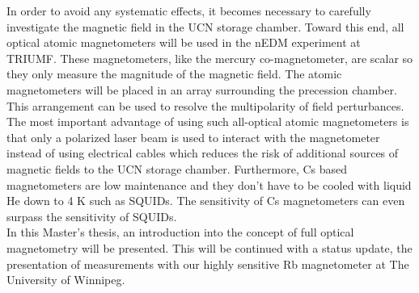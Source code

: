 In order to avoid any systematic effects, it becomes necessary to carefully investigate the magnetic field in the UCN storage chamber.  Toward this end, all optical atomic magnetometers will be used in the nEDM experiment at TRIUMF.  These magnetometers, like the mercury co-magnetometer, are scalar so they only measure the magnitude of the magnetic field.  The atomic  magnetometers will be placed in an array surrounding the precession chamber. This arrangement can be used to resolve the multipolarity of field perturbances. The most important advantage of using such all-optical atomic magnetometers is that only a polarized laser beam is used to interact with the magnetometer instead of using electrical cables which reduces the risk of additional sources of magnetic fields to the UCN storage chamber. Furthermore, Cs based magnetometers are low  maintenance and they don't have to be cooled with liquid He down to 4 K such as SQUIDs.  The sensitivity of Cs magnetometers can even surpass the sensitivity of SQUIDs. \\
In this Master's thesis, an introduction into the concept of full optical magnetometry will be presented. This will be continued with a status update, the presentation of measurements with our highly sensitive Rb magnetometer at The University of Winnipeg. 

